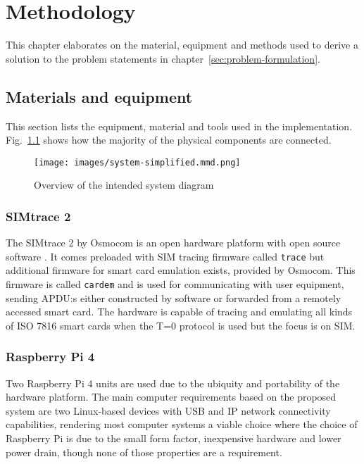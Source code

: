 \chapter{Methodology}

This chapter elaborates on the material, equipment and methods used
to derive a solution to the problem statements in chapter~\ref{sec:problem-formulation}.

\section{Materials and equipment}
\label{sec:materials-and-equipment}

This section lists the equipment, material and tools used in the
implementation. Fig.~\ref{fig:simplified-system-diagram} shows how
the majority of the physical components are connected.

\begin{figure}[ht]
	\centering
	\texttt{[image: images/system-simplified.mmd.png]}
	\caption{Overview of the intended system diagram}
	\label{fig:simplified-system-diagram}
\end{figure}

\subsection{SIMtrace 2}

The SIMtrace 2 by Osmocom is an open hardware platform with open
source software \cite{simtrace}. It comes preloaded with SIM
tracing firmware called \verb|trace| \cite{simtrace-wiki} but
additional firmware for smart card emulation exists, provided by
Osmocom. This firmware is called \verb|cardem|
\cite{simtrace-wiki} and is used for communicating with user
equipment, sending APDU:s either constructed by software or
forwarded from a remotely accessed smart card. The hardware is
capable of tracing and emulating all kinds of ISO 7816
\cite{etsi-ts-102-221} smart cards when the T=0 protocol is used
\cite{simtrace-wiki} but the focus is on SIM.

\subsection{Raspberry Pi 4}

Two Raspberry Pi 4 units are used due to the ubiquity and
portability of the hardware platform. The main computer
requirements based on the proposed system are two Linux-based
devices with USB and IP network connectivity capabilities,
rendering most computer systems a viable choice where the choice
of Raspberry Pi is due to the small form factor, inexpensive
hardware and lower power drain, though none of those properties
are a requirement.

